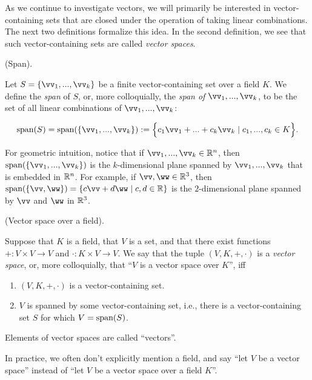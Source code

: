 As we continue to investigate vectors, we will primarily be interested in vector-containing sets that are closed under the operation of taking linear combinations. The next two definitions formalize this idea. In the second definition, we see that such vector-containing sets are called \textit{vector spaces}.

\begin{defn}
    (Span).
    
    Let $S = \{\vv_1, ..., \vv_k\}$ be a finite vector-containing set over a field $K$. We define the \textit{span} of $S$, or, more colloquially, the \textit{span of $\vv_1, ..., \vv_k$}, to be the set of all linear combinations of $\vv_1, ..., \vv_k$:
    
     \begin{align*}
        \spann(S) = \spann(\{\vv_1, ..., \vv_k\}) := \Big\{ c_1 \vv_1 + ... + c_k \vv_k \mid c_1, ..., c_k \in K \Big\}.
    \end{align*}
    
    For geometric intuition, notice that if $\vv_1, ..., \vv_k \in \R^n$, then $\spann(\{\vv_1, ..., \vv_k\})$ is the $k$-dimensional plane spanned by $\vv_1, ..., \vv_k$ that is embedded in $\mathbb{R}^n$. For example, if $\vv, \ww \in \R^3$, then ${\spann(\{\vv, \ww\}) = \{ c \vv + d \ww \mid c, d \in \R \}}$ is the $2$-dimensional plane spanned by $\vv$ and $\ww$ in $\mathbb{R}^3$.
\end{defn}

\begin{defn}
\label{ch::lin_alg::defn::vector_space}
    (Vector space over a field).
    
    Suppose that $K$ is a field, that $V$ is a set, and that there exist functions $+:V \times V \rightarrow V$ and $\cdot:K \times V \rightarrow V$. We say that the tuple $(V, K, +, \cdot)$ is a \textit{vector space}, or, more colloquially, that ``$V$ is a vector space over $K$'', iff 

    \begin{enumerate}
        \item $(V, K, +, \cdot)$ is a vector-containing set.
        \item $V$ is spanned by some vector-containing set, i.e., there is a vector-containing set $S$ for which $V = \text{span}(S)$. 
    \end{enumerate}
    
    Elements of vector spaces are called ``vectors''.
    
    In practice, we often don't explicitly mention a field, and say ``let $V$ be a vector space'' instead of ``let $V$ be a vector space over a field $K$''.
\end{defn}

